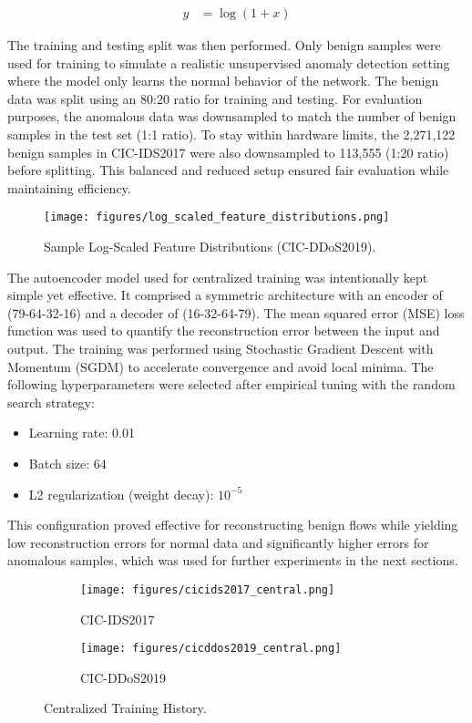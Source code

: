 \begin{align} \label{eq:logscaled}
y &= \log(1 + x)
\end{align}

The training and testing split was then performed. Only benign samples were used for training to simulate a realistic unsupervised anomaly detection setting where the model only learns the normal behavior of the network. The benign data was split using an 80:20 ratio for training and testing. For evaluation purposes, the anomalous data was downsampled to match the number of benign samples in the test set (1:1 ratio). To stay within hardware limits, the 2,271,122 benign samples in CIC-IDS2017 were also downsampled to 113,555 (1:20 ratio) before splitting. This balanced and reduced setup ensured fair evaluation while maintaining efficiency.

\begin{figure}[h]
    \centering
    \texttt{[image: figures/log\_scaled\_feature\_distributions.png]}
    \caption{Sample Log-Scaled Feature Distributions (CIC-DDoS2019).}
    \label{fig:log_scaled_feature_distribution}
\end{figure}

The autoencoder model used for centralized training was intentionally kept simple yet effective. It comprised a symmetric architecture with an encoder of (79-64-32-16) and a decoder of (16-32-64-79). The mean squared error (MSE) loss function was used to quantify the reconstruction error between the input and output. The training was performed using Stochastic Gradient Descent with Momentum (SGDM) to accelerate convergence and avoid local minima. The following hyperparameters were selected after empirical tuning with the random search strategy:

\begin{itemize}
    \item Learning rate: 0.01
    \item Batch size: 64
    \item L2 regularization (weight decay): $10^{-5}$
\end{itemize}
 
This configuration proved effective for reconstructing benign flows while yielding low reconstruction errors for normal data and significantly higher errors for anomalous samples, which was used for further experiments in the next sections.

\begin{figure}[h]
    \centering

    \begin{subfigure}[b]{0.49\textwidth}
        \centering
        \texttt{[image: figures/cicids2017\_central.png]}
        \caption{CIC-IDS2017}
    \end{subfigure}
    \hfill
    \begin{subfigure}[b]{0.49\textwidth}
        \centering
        \texttt{[image: figures/cicddos2019\_central.png]}
        \caption{CIC-DDoS2019}
    \end{subfigure}

    \caption{Centralized Training History.}
    \label{fig:central_perf}
\end{figure}

